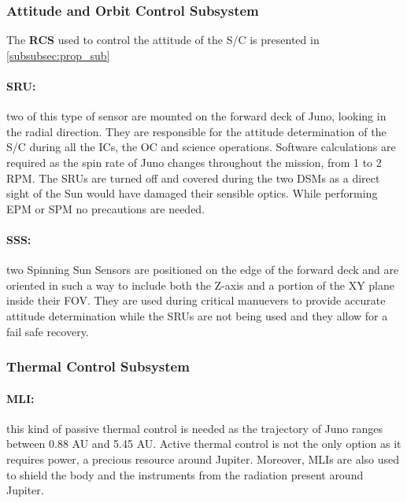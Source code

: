 \subsubsection{Attitude and Orbit Control Subsystem}
\label{subsubsec:aocs_sub}

\vspace{-1mm}

The \textbf{RCS} used to control the attitude of the S/C is presented in \autoref{subsubsec:prop_sub}

\vspace{-4mm}

\paragraph{SRU:}two of this type of sensor are mounted on the forward deck of Juno, looking in the radial direction.
They are responsible for the attitude determination of the S/C during all the ICs, the OC and science operations.
Software calculations are required as the spin rate of Juno changes throughout the mission, from 1 to 2 RPM.
The SRUs are turned off and covered during the two DSMs as a direct sight of the Sun would have damaged their sensible optics.
While performing EPM or SPM no precautions are needed. \cite{SRU}

\vspace{-4mm}

\paragraph{SSS:}two Spinning Sun Sensors are positioned on the edge of the forward deck and are oriented in such a way to include both the Z-axis and a portion of the XY plane inside their FOV.
They are used during critical manuevers to provide accurate attitude determination while the SRUs are not being used and they allow for a fail safe recovery. \cite{SSS}

\subsubsection{Thermal Control Subsystem}
\label{subsubsec:tcs_sub}

\vspace{-1mm}

\paragraph{MLI:}this kind of passive thermal control is needed as the trajectory of Juno ranges between 0.88 AU and 5.45 AU.
Active thermal control is not the only option as it requires power, a precious resource around Jupiter.
Moreover, MLIs are also used to shield the body and the instruments from the radiation present around Jupiter.

